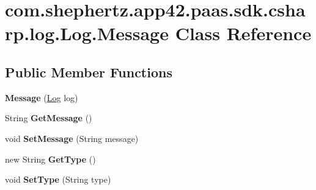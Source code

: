 \hypertarget{classcom_1_1shephertz_1_1app42_1_1paas_1_1sdk_1_1csharp_1_1log_1_1_log_1_1_message}{\section{com.\+shephertz.\+app42.\+paas.\+sdk.\+csharp.\+log.\+Log.\+Message Class Reference}
\label{classcom_1_1shephertz_1_1app42_1_1paas_1_1sdk_1_1csharp_1_1log_1_1_log_1_1_message}
}
\subsection*{Public Member Functions}
\begin{DoxyCompactItemize}
\item 
\hypertarget{classcom_1_1shephertz_1_1app42_1_1paas_1_1sdk_1_1csharp_1_1log_1_1_log_1_1_message_a18cac8c6a770816532cff3ddea549287}{{\bfseries Message} (\hyperlink{classcom_1_1shephertz_1_1app42_1_1paas_1_1sdk_1_1csharp_1_1log_1_1_log}{Log} log)}\label{classcom_1_1shephertz_1_1app42_1_1paas_1_1sdk_1_1csharp_1_1log_1_1_log_1_1_message_a18cac8c6a770816532cff3ddea549287}

\item 
\hypertarget{classcom_1_1shephertz_1_1app42_1_1paas_1_1sdk_1_1csharp_1_1log_1_1_log_1_1_message_ac7ab6b3457d83b273cadf0ca842378fc}{String {\bfseries Get\+Message} ()}\label{classcom_1_1shephertz_1_1app42_1_1paas_1_1sdk_1_1csharp_1_1log_1_1_log_1_1_message_ac7ab6b3457d83b273cadf0ca842378fc}

\item 
\hypertarget{classcom_1_1shephertz_1_1app42_1_1paas_1_1sdk_1_1csharp_1_1log_1_1_log_1_1_message_abe6fde235782a34c62f3e8b68cebedba}{void {\bfseries Set\+Message} (String message)}\label{classcom_1_1shephertz_1_1app42_1_1paas_1_1sdk_1_1csharp_1_1log_1_1_log_1_1_message_abe6fde235782a34c62f3e8b68cebedba}

\item 
\hypertarget{classcom_1_1shephertz_1_1app42_1_1paas_1_1sdk_1_1csharp_1_1log_1_1_log_1_1_message_a3ed7ecb9fd190405532ea938d489a611}{new String {\bfseries Get\+Type} ()}\label{classcom_1_1shephertz_1_1app42_1_1paas_1_1sdk_1_1csharp_1_1log_1_1_log_1_1_message_a3ed7ecb9fd190405532ea938d489a611}

\item 
\hypertarget{classcom_1_1shephertz_1_1app42_1_1paas_1_1sdk_1_1csharp_1_1log_1_1_log_1_1_message_ac6c62953c5f4561a3a7195be91394737}{void {\bfseries Set\+Type} (String type)}\label{classcom_1_1shephertz_1_1app42_1_1paas_1_1sdk_1_1csharp_1_1log_1_1_log_1_1_message_ac6c62953c5f4561a3a7195be91394737}


\end{DoxyCompactItemize}
